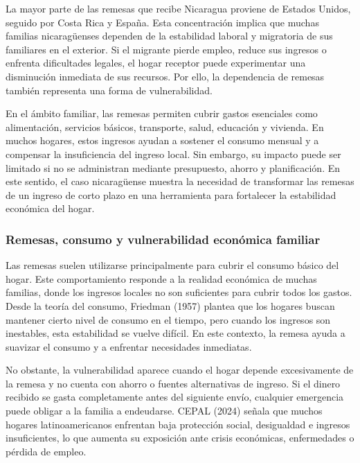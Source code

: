 \documentclass[12pt,letterpaper]{article}
\begin{document}
La mayor parte de las remesas que recibe Nicaragua proviene de Estados Unidos, seguido por Costa Rica y España. Esta concentración implica que muchas familias nicaragüenses dependen de la estabilidad laboral y migratoria de sus familiares en el exterior. Si el migrante pierde empleo, reduce sus ingresos o enfrenta dificultades legales, el hogar receptor puede experimentar una disminución inmediata de sus recursos. Por ello, la dependencia de remesas también representa una forma de vulnerabilidad.

En el ámbito familiar, las remesas permiten cubrir gastos esenciales como alimentación, servicios básicos, transporte, salud, educación y vivienda. En muchos hogares, estos ingresos ayudan a sostener el consumo mensual y a compensar la insuficiencia del ingreso local. Sin embargo, su impacto puede ser limitado si no se administran mediante presupuesto, ahorro y planificación. En este sentido, el caso nicaragüense muestra la necesidad de transformar las remesas de un ingreso de corto plazo en una herramienta para fortalecer la estabilidad económica del hogar.

\subsubsection{\texorpdfstring{\textbf{Remesas, consumo y vulnerabilidad económica familiar}}{Remesas, consumo y vulnerabilidad económica familiar}}\label{remesas-consumo-y-vulnerabilidad-econuxf3mica-familiar}

Las remesas suelen utilizarse principalmente para cubrir el consumo básico del hogar. Este comportamiento responde a la realidad económica de muchas familias, donde los ingresos locales no son suficientes para cubrir todos los gastos. Desde la teoría del consumo, Friedman (1957) plantea que los hogares buscan mantener cierto nivel de consumo en el tiempo, pero cuando los ingresos son inestables, esta estabilidad se vuelve difícil. En este contexto, la remesa ayuda a suavizar el consumo y a enfrentar necesidades inmediatas.

No obstante, la vulnerabilidad aparece cuando el hogar depende excesivamente de la remesa y no cuenta con ahorro o fuentes alternativas de ingreso. Si el dinero recibido se gasta completamente antes del siguiente envío, cualquier emergencia puede obligar a la familia a endeudarse. CEPAL (2024) señala que muchos hogares latinoamericanos enfrentan baja protección social, desigualdad e ingresos insuficientes, lo que aumenta su exposición ante crisis económicas, enfermedades o pérdida de empleo.
\end{document}
